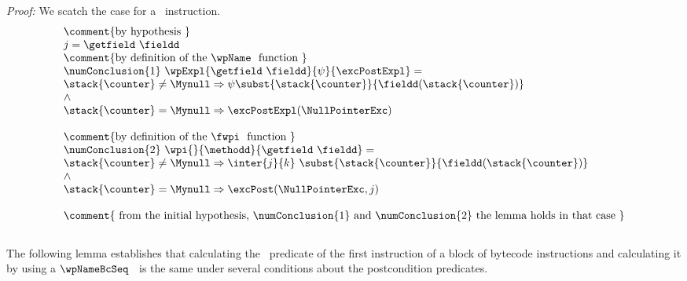\textit{Proof:}
We scatch the case for a \getfield \  instruction.
$$
\begin{array}{l}
  \mbox{\rm\comment{by hypothesis }} \\
    j = \getfield \ \fieldd \\
   \mbox{\rm\comment{by definition of the \wpName \  function }} \\
    \numConclusion{1} \  \wpExpl{\getfield \ \fieldd }{\psi}{\excPostExpl} = \\
    
        \stack{\counter } \neq \Mynull \Rightarrow 
			                \psi   \subst{ \stack{\counter} }{ \fieldd(\stack{\counter})}\\          
			  \wedge \\
			  \stack{\counter }  = \Mynull  \Rightarrow   \excPostExpl( \NullPointerExc ) \\\\


  \mbox{\rm\comment{by definition of the \fwpi \  function }} \\
\numConclusion{2} \  \wpi{}{\methodd}{ \getfield \ \fieldd} = \\
                           \stack{\counter } \neq \Mynull \Rightarrow 
			         \inter{j}{k}   \  \subst{ \stack{\counter} }{ \fieldd(\stack{\counter})}\\          
			  \wedge \\
			  \stack{\counter }  = \Mynull  \Rightarrow   \excPost( \NullPointerExc,j ) \\\\

  \mbox{\rm\comment{ from the initial hypothesis, \numConclusion{1}  and \numConclusion{2} the lemma holds in that case   }}
    

\end{array}
$$
\Qed\\

The following lemma establishes 
that calculating the \fwpi \ predicate of the first instruction of a block of bytecode 
instructions and calculating it by using a $\wpNameBcSeq$ \ is the same under several conditions about the postcondition predicates.



